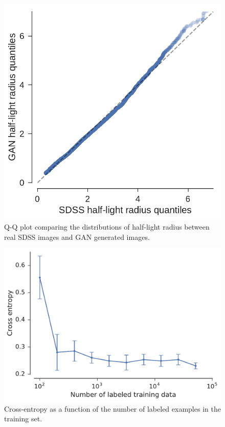 \begin{figure}
  \centering
  \includegraphics[width=\columnwidth]{figures/size_qq.pdf}
  \caption{Q-Q plot comparing the distributions of half-light radius between real SDSS images and GAN generated images.}
  \label{fig:size_qq}
\end{figure}

\begin{figure}
  \centering
  \includegraphics[width=\columnwidth]{figures/loss_vs_n.pdf}
  \caption{Cross-entropy as a function of the number of labeled examples in the training set.}
  \label{fig:loss_vs_n}
\end{figure}

